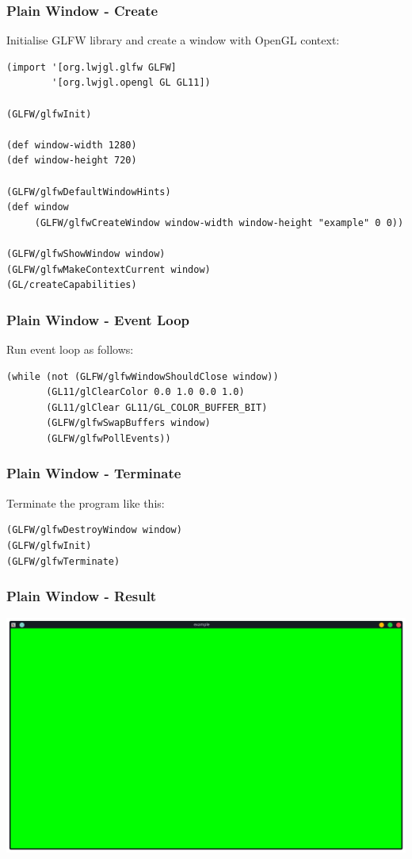\documentclass[aspectratio=169,11pt,xcolor=dvipsnames]{beamer}
\begin{document}
\begin{frame}[fragile]
  \frametitle{Plain Window {-} Create}
  Initialise GLFW library and create a window with OpenGL context:
  \begin{verbatim}
(import '[org.lwjgl.glfw GLFW]
        '[org.lwjgl.opengl GL GL11])

(GLFW/glfwInit)

(def window-width 1280)
(def window-height 720)

(GLFW/glfwDefaultWindowHints)
(def window
     (GLFW/glfwCreateWindow window-width window-height "example" 0 0))

(GLFW/glfwShowWindow window)
(GLFW/glfwMakeContextCurrent window)
(GL/createCapabilities)
  \end{verbatim}
\end{frame}

\begin{frame}[fragile]
  \frametitle{Plain Window {-} Event Loop}
  Run event loop as follows:
  \begin{verbatim}
(while (not (GLFW/glfwWindowShouldClose window))
       (GL11/glClearColor 0.0 1.0 0.0 1.0)
       (GL11/glClear GL11/GL_COLOR_BUFFER_BIT)
       (GLFW/glfwSwapBuffers window)
       (GLFW/glfwPollEvents))
  \end{verbatim}
\end{frame}

\begin{frame}[fragile]
  \frametitle{Plain Window {-} Terminate}
  Terminate the program like this:
  \begin{verbatim}
(GLFW/glfwDestroyWindow window)
(GLFW/glfwInit)
(GLFW/glfwTerminate)
  \end{verbatim}
\end{frame}

\begin{frame}
  \frametitle{Plain Window {-} Result}
  \begin{center}
    \includegraphics[width=.8\textwidth]{window}
  \end{center}
\end{frame}
\end{document}
